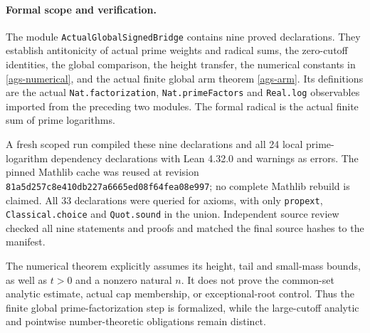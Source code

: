 \paragraph{Formal scope and verification.}
The module \texttt{ActualGlobalSignedBridge} contains nine proved
declarations. They establish antitonicity of actual prime weights
and radical sums, the zero-cutoff identities, the global comparison,
the height transfer, the numerical constants in
\eqref{ags-numerical}, and the actual finite global arm theorem
\eqref{ags-arm}. Its definitions are the actual
\texttt{Nat.factorization}, \texttt{Nat.primeFactors} and
\texttt{Real.log} observables imported from the preceding two modules.
The formal radical is the actual finite sum of prime logarithms.

A fresh scoped run compiled these nine declarations and all 24 local
prime-logarithm dependency declarations with Lean 4.32.0 and warnings
as errors. The pinned Mathlib cache was reused at revision
\texttt{81a5d257c8e410db227a6665ed08f64fea08e997}; no complete Mathlib
rebuild is claimed. All 33 declarations were queried for axioms, with
only \texttt{propext}, \texttt{Classical.choice} and \texttt{Quot.sound}
in the union. Independent source review checked all nine statements
and proofs and matched the final source hashes to the manifest.

The numerical theorem explicitly assumes its height, tail and
small-mass bounds, as well as $t>0$ and a nonzero natural $n$.
It does not prove the common-set analytic estimate, actual cap
membership, or exceptional-root control. Thus the finite global
prime-factorization step is formalized, while the large-cutoff
analytic and pointwise number-theoretic obligations remain distinct.
